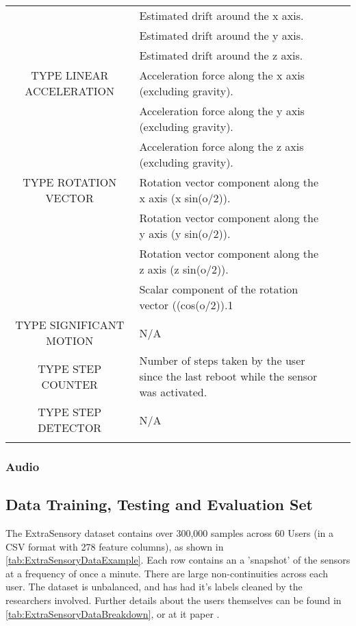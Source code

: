 \documentclass{UoNMCHA}
\numberwithin{equation}{section}
\begin{document}
\begin{table}[h!]
\begin{center}
{\begin{tabular}{c l l l|}
                  & Estimated drift around the x axis. \\
                  & Estimated drift around the y axis. \\
                  & Estimated drift around the z axis. \\
                TYPE LINEAR ACCELERATION & Acceleration force along the x axis (excluding gravity). \\
                  & Acceleration force along the y axis (excluding gravity). \\
                  & Acceleration force along the z axis (excluding gravity). \\
                TYPE ROTATION VECTOR & Rotation vector component along the x axis (x  sin(o/2)). \\
                  & Rotation vector component along the y axis (y  sin(o/2)). \\
                  & Rotation vector component along the z axis (z  sin(o/2)). \\
                  & Scalar component of the rotation vector ((cos(o/2)).1 \\
                TYPE SIGNIFICANT MOTION & N/A \\
                TYPE STEP COUNTER & Number of steps taken by the user since the last reboot while the sensor was activated. \\
                TYPE STEP DETECTOR & N/A \\
                \\ \hline
            \end{tabular}
        }
    \end{center}
\end{table}

\subsubsection{Audio}


\subsection{Data Training, Testing and Evaluation Set}
The ExtraSensory dataset contains over 300,000 samples across 60 Users (in a CSV format with 278 feature columns), as shown in \ref{tab:ExtraSensoryDataExample}. Each row contains an a 'snapshot' of the sensors at a frequency of once a minute. There are large non-continuities across each user. The dataset is unbalanced, and has had it's labels cleaned by the researchers involved. Further details about the users themselves can be found in \ref{tab:ExtraSensoryDataBreakdown}, or at it paper \cite{Vaizman2017}.
\end{document}
